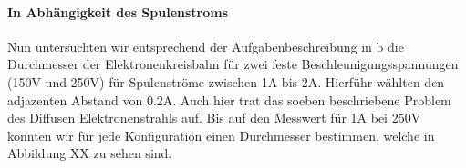 \paragraph{In Abhängigkeit des Spulenstroms}
Nun untersuchten wir entsprechend der Aufgabenbeschreibung in b die  Durchmesser der Elektronenkreisbahn für zwei feste Beschleunigungsspannungen (150V und 250V) für Spulenströme zwischen 1A bis 2A. Hierführ wählten den adjazenten Abstand von 0.2A. Auch hier trat das soeben beschriebene Problem des Diffusen Elektronenstrahls auf. Bis auf den Messwert für 1A bei 250V konnten wir für jede Konfiguration einen Durchmesser bestimmen, welche in Abbildung XX zu sehen sind.






